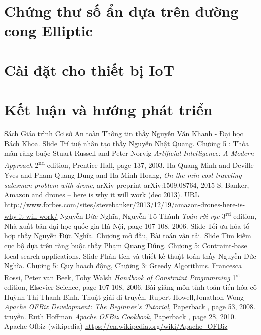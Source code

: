\documentclass[a4paper,12pt]{report}
\begin{document}
\chapter{Chứng thư số ẩn dựa trên đường cong Elliptic}
\chapter{Cài đặt cho thiết bị IoT}
\chapter*{Kết luận và hướng phát triển}
\begin{thebibliography}{9}
 Sách Giáo trình Cơ sở An toàn Thông tin thầy Nguyễn Văn Khanh - Đại học Bách Khoa.
 Slide Trí tuệ nhân tạo thầy Nguyễn Nhật Quang. Chương 5 : Thỏa mãn ràng buộc
 Stuart Russell and Peter Norvig 
\textit{Artificial Intelligence: A Modern Approach} 2\textsuperscript{nd } edition, Prentice Hall, page 137,  2003.
 Ha Quang Minh and Deville Yves and Pham Quang Dung and Ha Minh Hoang, \textit{On the min cost traveling salesman problem with drone}, arXiv preprint arXiv:1509.08764, 2015
 S. Banker, Amazon and drones – here is why it will work (dec 2013).
URL \url{http://www.forbes.com/sites/stevebanker/2013/12/19/amazon-drones-here-is-why-it-will-work/}
 Nguyễn Đức Nghĩa, Nguyễn Tô Thành 
\textit{Toán rời rạc} 3\textsuperscript{rd} edition, Nhà xuất bản đại học quốc gia Hà Nội, page 107-108,  2006.
 Slide Tối ưu hóa tổ hợp thầy Nguyễn Đức Nghĩa. Chương mở đầu, Bài toán vận tải.
 Slide Tìm kiếm cục bộ dựa trên ràng buộc thầy Phạm Quang Dũng. Chương 5: Contraint-base local search applications.
 Slide Phân tích và thiết kế thuật toán thầy Nguyễn Đức Nghĩa. Chương 5: Quy hoạch động, Chương 3: Greedy Algorithms.
 Francesca Rossi, Peter van Beek, Toby Walsh 
\textit{Handbook of Constraint Programming} 1\textsuperscript{st} edition, Elsevier Science, page 107-108,  2006.
 Bài giảng môn tính toán tiến hóa cô Huỳnh Thị Thanh Bình. Thuật giải di truyền.
Rupert Howell,Jonathon Wong
\textit{Apache OFBiz Development: The Beginner's Tutorial}, Paperback , page 53,  2008.
truyền.
 Ruth Hoffman
\textit{Apache OFBiz Cookbook}, Paperback , page 28, 2010.
 Apache Ofbiz (wikipedia)
\url{https://en.wikipedia.org/wiki/Apache_OFBiz}
\end{thebibliography}
\end{document}
